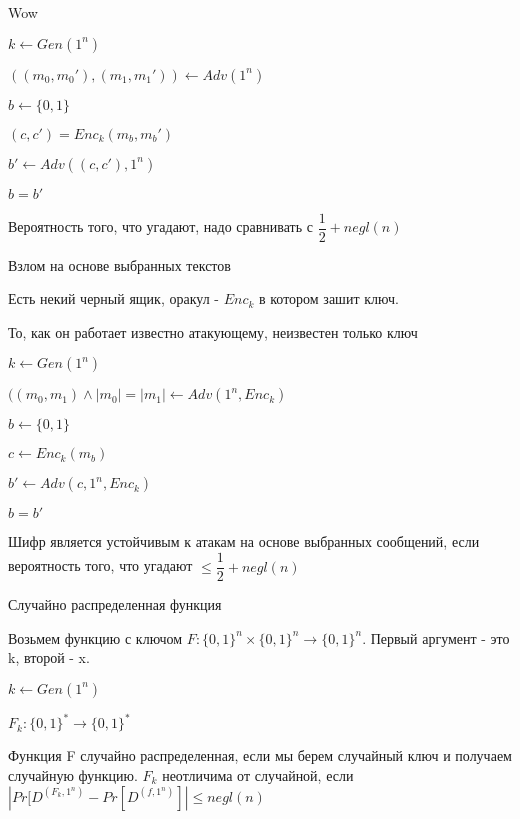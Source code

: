\begin{para}{Wow}

$k \leftarrow Gen(1^n)$

$((m_0, m_0'), (m_1, m_1')) \leftarrow Adv(1^n)$

$b \leftarrow \{0, 1\}$

$(c, c') = Enc_k(m_b, m_b')$

$b' \leftarrow Adv((c, c'), 1^n)$

$b = b'$

Вероятность того, что угадают, надо сравнивать с $\dfrac{1}{2} + negl(n)$

\end{para}


\begin{para}{Взлом на основе выбранных текстов}

Есть некий черный ящик, оракул - $Enc_k$ в котором зашит ключ. 

То, как он работает известно атакующему, неизвестен только ключ

$k \leftarrow Gen(1^n)$

$((m_0, m_1) \wedge |m_0| = |m_1| \leftarrow Adv(1^n, Enc_k)$

$b \leftarrow \{0, 1\}$

$c \leftarrow Enc_k(m_b)$

$b' \leftarrow Adv(c, 1^n, Enc_k)$

$b = b'$

Шифр является устойчивым к атакам на основе выбранных сообщений, если вероятность того, что угадают $\leq \dfrac{1}{2} + negl(n)$

\end{para}

\begin{para}{Случайно распределенная функция}

Возьмем функцию с ключом $F : \{0, 1\}^n \times \{0, 1\}^n \rightarrow \{0, 1\}^n$. Первый аргумент - это k, второй - x.

$k \leftarrow Gen(1^n)$

$F_k : \{0, 1\}^* \rightarrow \{0, 1\}^*$

Функция F случайно распределенная, если мы берем случайный ключ и получаем случайную функцию.
$F_k$ неотличима от случайной, если $|Pr[D^{(F_k, 1^n)} - Pr[D^{(f, 1^n)}]| \leq negl(n)$


\end{para}